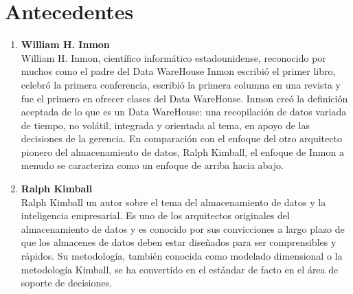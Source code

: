 \documentclass[twoside,twocolumn]{article}
\begin{document}


\section{Antecedentes}

\begin{enumerate}

 \item \textbf{William H. Inmon}
\\
William H. Inmon, científico informático estadounidense, reconocido por muchos como el padre del Data WareHouse Inmon escribió el primer libro, celebró la primera conferencia, escribió la primera columna en una revista y fue el primero en ofrecer clases del Data WareHouse. Inmon creó la definición aceptada de lo que es un Data WareHouse: una recopilación de datos variada de tiempo, no volátil, integrada y orientada al tema, en apoyo de las decisiones de la gerencia. En comparación con el enfoque del otro arquitecto pionero del almacenamiento de datos, Ralph Kimball, el enfoque de Inmon a menudo se caracteriza como un enfoque de arriba hacia abajo.
\\ 

\item \textbf{Ralph Kimball}
\\
Ralph Kimball  un autor sobre el tema del almacenamiento de datos y la inteligencia empresarial. Es uno de los arquitectos originales del almacenamiento de datos y es conocido por sus convicciones a largo plazo de que los almacenes de datos deben estar diseñados para ser comprensibles y rápidos. Su metodología, también conocida como modelado dimensional o la metodología Kimball, se ha convertido en el estándar de facto en el área de soporte de decisiones.

\end{enumerate}

\end{document}
